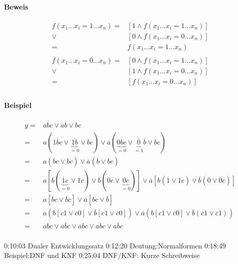 \documentclass[a4paper]{scrartcl}
\begin{document}
			\paragraph{Beweis}
			\begin{align*}
				f(x_1 \dots x_i = 1 \dots  x_n) =& [1 \wedge f(x_1 \dots x_i = 1 \dots x_n )] \\
				\vee & [ 0 \wedge f(x_1 \dots x_i =  0 \dots x_n)] \\
				= & f(x_1 \dots x_i = 1 \dots x_n)\\
				\\
				f(x_1 \dots x_i = 0 \dots  x_n) =& [0 \wedge f(x_1 \dots x_i = 1 \dots x_n )] \\
				\vee & [1 \wedge f(x_1 \dots x_i = 0 \dots x_n )] \\
				= & [f(x_1 \dots x_i = 0 \dots x_n)]\\
			\end{align*}
			
			\paragraph{Beispiel}
			\begin{align*}
				y =& a \overline{b} c \vee \overline{a} \overline{b} \vee bc\\
				=& a(1 \overline{b} c \vee \underbrace{\overline{1b}}_{=0} \vee bc ) \vee \overline{a} (\underbrace{0 \overline{b} c}_{=0}  \vee \underbrace{\overline{0 }}_{=1} \overline{b} \vee bc)\\
				=& a( \overline{b} c \vee bc ) \vee \overline{a} (\overline{b}  \vee bc)\\
				=& a[ b(\underbrace {\overline{1}c}_{=0}  \vee 1c) \vee \overline{b} (\overline{0}c \vee \underbrace{0c}_{=0})] \vee \overline{a}  [b (\overline{1} \vee 1c) \vee \overline{b} (\overline{0}  \vee 0c)]\\
				=& a [ bc \vee \overline{b} c] \vee \overline{a} [bc \vee \overline{b}]\\
				=& a(b[c1 \vee \overline{c} 0 ] \vee \overline{b} [c1 \vee \overline{c}0]) \vee \overline{a} (b[c1 \vee \overline{c} 0 ] \vee \overline{b} (c1 \vee \overline{c} 1))\\
				= & abc \vee a \overline{b} c \vee \overline{a} bc \vee \overline{ab} c \vee \overline{abc}\\
			\end{align*}
			
			0:10:03 Dualer Entwicklungssatz 
			0:12:20 Deutung:Normalformen 
			0:18:49 Beispiel:DNF und KNF 
			0:25:04 DNF/KNF: Kurze Schreibweise 
\end{document}
